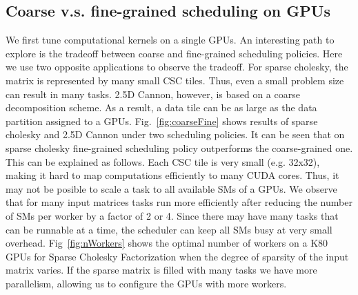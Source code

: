 \subsection{Coarse v.s. fine-grained scheduling on GPUs}
We first tune computational kernels on a single GPUs.
An interesting path to explore is the tradeoff between coarse and fine-grained scheduling policies.  
Here we use two opposite applications to observe the tradeoff.
For sparse cholesky, the matrix is represented by many small CSC tiles.
Thus, even a small problem size can result in many tasks.
2.5D Cannon, however, is based on a coarse decomposition scheme.
As a result, a data tile can be as large as the data partition assigned to a GPUs.
Fig.~\ref{fig:coarseFine} shows results of sparse cholesky and 2.5D Cannon under two scheduling policies.
It can be seen that on sparse cholesky fine-grained scheduling policy outperforms the coarse-grained one.
This can be explained as follows.
Each CSC tile is very small (e.g. 32x32), making it hard to map computations efficiently to many CUDA cores.
Thus, it may not be posible to scale a task to all available SMs of a GPUs.
We observe that for many input matrices tasks run more efficiently after reducing the number of SMs per worker by a factor of 2 or 4.
Since there may have many tasks that can be runnable at a time, the scheduler can keep all SMs busy at very small overhead.
Fig~\ref{fig:nWorkers} shows the optimal number of workers on a K80 GPUs for Sparse Cholesky Factorization when the degree of sparsity of the input matrix varies.
If the sparse matrix is filled with many tasks we have more parallelism, allowing us to configure the GPUs with more workers.

